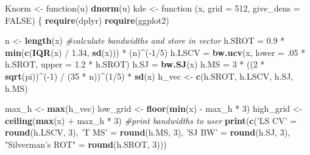 \documentclass[]{article}
\newenvironment{Shaded}{\begin{snugshade}}{\end{snugshade}}
\newcommand{\KeywordTok}[1]{\textcolor[rgb]{0.13,0.29,0.53}{\textbf{{#1}}}}
\newcommand{\DataTypeTok}[1]{\textcolor[rgb]{0.13,0.29,0.53}{{#1}}}
\newcommand{\DecValTok}[1]{\textcolor[rgb]{0.00,0.00,0.81}{{#1}}}
\newcommand{\FloatTok}[1]{\textcolor[rgb]{0.00,0.00,0.81}{{#1}}}
\newcommand{\StringTok}[1]{\textcolor[rgb]{0.31,0.60,0.02}{{#1}}}
\newcommand{\CommentTok}[1]{\textcolor[rgb]{0.56,0.35,0.01}{\textit{{#1}}}}
\newcommand{\OtherTok}[1]{\textcolor[rgb]{0.56,0.35,0.01}{{#1}}}
\newcommand{\NormalTok}[1]{{#1}}
\begin{document}
\begin{Shaded}
\begin{Highlighting}[]
\NormalTok{Knorm <-}\StringTok{ }\NormalTok{function(u) }\KeywordTok{dnorm}\NormalTok{(u)}
\NormalTok{kde <-}\StringTok{ }\NormalTok{function (x, }\DataTypeTok{grid =} \DecValTok{512}\NormalTok{, }\DataTypeTok{give_dens =} \OtherTok{FALSE}\NormalTok{) }
\NormalTok{\{}
    \KeywordTok{require}\NormalTok{(dplyr)}
    \KeywordTok{require}\NormalTok{(ggplot2)}
    
    \NormalTok{n <-}\StringTok{ }\KeywordTok{length}\NormalTok{(x)}
    \CommentTok{#calculate bandwidths and store in vector}
    \NormalTok{h.SROT =}\StringTok{ }\FloatTok{0.9} \NormalTok{*}\StringTok{ }\KeywordTok{min}\NormalTok{(}\KeywordTok{c}\NormalTok{(}\KeywordTok{IQR}\NormalTok{(x) /}\StringTok{ }\FloatTok{1.34}\NormalTok{, }\KeywordTok{sd}\NormalTok{(x))) *}\StringTok{ }\NormalTok{(n)^(-}\DecValTok{1}\NormalTok{/}\DecValTok{5}\NormalTok{)}
    \NormalTok{h.LSCV =}\StringTok{ }\KeywordTok{bw.ucv}\NormalTok{(x, }\DataTypeTok{lower =} \NormalTok{.}\DecValTok{05} \NormalTok{*}\StringTok{ }\NormalTok{h.SROT, }\DataTypeTok{upper =} \FloatTok{1.2} \NormalTok{*}\StringTok{ }\NormalTok{h.SROT)}
    \NormalTok{h.SJ =}\StringTok{ }\KeywordTok{bw.SJ}\NormalTok{(x)}
    \NormalTok{h.MS =}\StringTok{ }\DecValTok{3} \NormalTok{*}\StringTok{ }\NormalTok{((}\DecValTok{2} \NormalTok{*}\StringTok{ }\KeywordTok{sqrt}\NormalTok{(pi))^(-}\DecValTok{1}\NormalTok{) /}\StringTok{ }\NormalTok{(}\DecValTok{35} \NormalTok{*}\StringTok{ }\NormalTok{n))^(}\DecValTok{1}\NormalTok{/}\DecValTok{5}\NormalTok{) *}\StringTok{ }\KeywordTok{sd}\NormalTok{(x)}
    \NormalTok{h_vec <-}\StringTok{ }\KeywordTok{c}\NormalTok{(h.SROT, h.LSCV, h.SJ, h.MS)}
    
    \NormalTok{max_h <-}\StringTok{ }\KeywordTok{max}\NormalTok{(h_vec)}
    \NormalTok{low_grid <-}\StringTok{ }\KeywordTok{floor}\NormalTok{(}\KeywordTok{min}\NormalTok{(x) -}\StringTok{ }\NormalTok{max_h *}\StringTok{ }\DecValTok{3}\NormalTok{)}
    \NormalTok{high_grid <-}\StringTok{ }\KeywordTok{ceiling}\NormalTok{(}\KeywordTok{max}\NormalTok{(x) +}\StringTok{ }\NormalTok{max_h *}\StringTok{ }\DecValTok{3}\NormalTok{)}
    \CommentTok{#print bandwidths to user}
    \KeywordTok{print}\NormalTok{(}\KeywordTok{c}\NormalTok{(}\StringTok{'LS CV'} \NormalTok{=}\StringTok{ }\KeywordTok{round}\NormalTok{(h.LSCV, }\DecValTok{3}\NormalTok{),}
            \StringTok{'T MS'} \NormalTok{=}\StringTok{ }\KeywordTok{round}\NormalTok{(h.MS, }\DecValTok{3}\NormalTok{),}
            \StringTok{'SJ BW'} \NormalTok{=}\StringTok{ }\KeywordTok{round}\NormalTok{(h.SJ, }\DecValTok{3}\NormalTok{),}
            \StringTok{"Silverman's ROT"} \NormalTok{=}\StringTok{ }\KeywordTok{round}\NormalTok{(h.SROT, }\DecValTok{3}\NormalTok{)))}


\end{Highlighting}
\end{Shaded}
\end{document}
